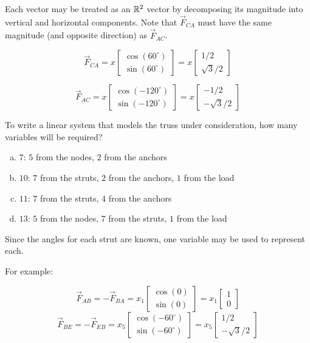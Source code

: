 \begin{applicationActivities}
\begin{observation}
\drawtruss{}

Each vector may be treated as an \(\mathbb{R}^2\) vector by
decomposing its magnitude into vertical and horizontal components.
Note that \(\vec F_{CA}\) must have the same magnitude (and opposite
direction) as \(\vec F_{AC}\).

\[
  \vec{F}_{CA}
    = 
  x\begin{bmatrix} \cos(60^\circ) \\ \sin(60^\circ) \end{bmatrix}
    =
  x\begin{bmatrix} 1/2 \\ \sqrt{3}/2\end{bmatrix}
\]

\[
  \vec{F}_{AC}
    = 
  x\begin{bmatrix} \cos(-120^\circ) \\ \sin(-120^\circ) \end{bmatrix}
    =
  x\begin{bmatrix} -1/2 \\ -\sqrt{3}/2\end{bmatrix}
\]
\end{observation}

\begin{activity}{5}
To write a linear system that models the truss under consideration,
how many variables will be required?

\drawtruss{}

\begin{enumerate}[a)]
\item \(7\): \(5\) from the nodes, \(2\) from the anchors
\item \(10\): \(7\) from the struts, \(2\) from the anchors, \(1\) from the load
\item \(11\): \(7\) from the struts, \(4\) from the anchors
\item \(13\): \(5\) from the nodes, \(7\) from the struts, \(1\) from the load
\end{enumerate}
\end{activity}

\begin{observation}
Since the angles for each strut are known,
one variable may be used to represent each.

\drawtruss{\trussStrutVariables}

For example:

\[
\vec F_{AB}=-\vec F_{BA}=x_1\begin{bmatrix}\cos(0)\\\sin(0)\end{bmatrix}
=x_1\begin{bmatrix}1\\0\end{bmatrix}
\]
\[
\vec F_{BE}=-\vec F_{EB}=x_5\begin{bmatrix}\cos(-60^\circ)\\\sin(-60^\circ)\end{bmatrix}
=x_5\begin{bmatrix}1/2\\-\sqrt{3}/2\end{bmatrix}
\]



\end{observation}
\end{applicationActivities}
